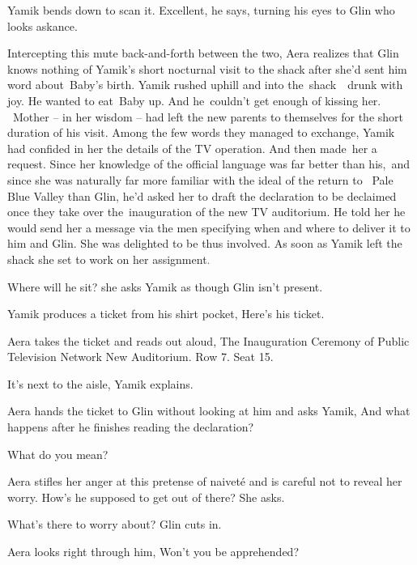 \documentclass[letterpaper]{article}
\begin{document}
Yamik bends down to scan it. {\textquotedbl}Excellent,{\textquotedbl} he says, turning his eyes to Glin who looks
askance.

Intercepting this mute back-and-forth between the two, Aera realizes that Glin knows nothing of Yamik's short nocturnal
visit to the shack after she'd sent him word about\ Baby's birth. Yamik rushed uphill and into the\ shack\ \ drunk with
joy. He wanted to eat\ Baby up. And he\textcolor{red}{\ }couldn't get enough of kissing her. ~Mother -- in her wisdom
-- had left the new parents to themselves for the short duration of his visit. Among the few words they managed to
exchange, Yamik had confided in her the details of the TV operation. And then made\ her a request. Since her knowledge
of the official language was far better than his,\ and since she was naturally far more familiar with the ideal of the
return to \ Pale Blue Valley than Glin, he'd asked her to draft the declaration to be declaimed once they take over
the\ inauguration of the new TV auditorium. He told her he would send her a message via the men specifying when and
where to deliver it to him and Glin. She was delighted to be thus involved. As soon as Yamik left the shack she set to
work on her assignment\textcolor{red}{. }

{\textquotedbl}Where will he sit?{\textquotedbl} she asks Yamik as though Glin isn't present. 

Yamik produces a ticket from his shirt pocket, {\textquotedbl}Here's his ticket.{\textquotedbl} 

Aera takes the ticket and reads out aloud, {\textquotedbl}The Inauguration Ceremony of Public Television Network New
Auditorium. Row 7. Seat 15.{\textquotedbl} 

{\textquotedbl}It's next to the aisle,{\textquotedbl} Yamik explains. 

Aera hands the ticket to Glin without looking at him and asks Yamik, {\textquotedbl}And what happens after he finishes
reading the declaration?{\textquotedbl} 

{\textquotedbl}What do you mean?{\textquotedbl} 

Aera stifles her anger at this pretense of naivet\'e and is careful not to reveal her worry. {\textquotedbl}How's he
supposed to get out of there?{\textquotedbl} She asks.\ 

{\textquotedbl}What's there to worry about?{\textquotedbl} Glin cuts in\textcolor[rgb]{0.0,0.4392157,0.7529412}{.}

Aera looks right through him, {\textquotedbl}Won't you be apprehended?{\textquotedbl} 
\end{document}
